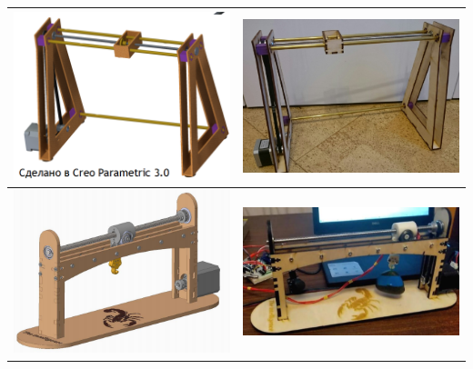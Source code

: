 \begin{longtable}{|p{7cm}|p{7cm}|}
    \includegraphics[width=7cm]{6} & \includegraphics[width=7cm]{7} \\
    \hline
    \includegraphics[width=7cm]{8} & \includegraphics[width=7cm]{9} \\
    \hline
\end{longtable}